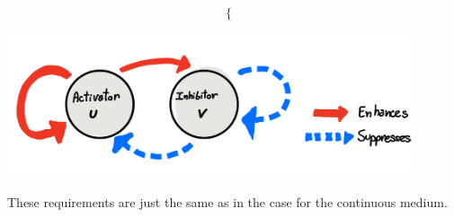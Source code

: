 \begin{enumerate}
\begin{center}
\begin{minipage}{0.4\textwidth}
$$\begin{cases}
        \end{cases} 
    $$
    \end{minipage}
    \begin{minipage}{0.5 \textwidth}
    \centering
	\includegraphics[width=0.9\textwidth]{images/turing/diagram.jpeg}
 \label{fig:diagram}
    \end{minipage}
    \end{center}
\end{enumerate}
These requirements are just the same as in the case for the continuous medium. 
